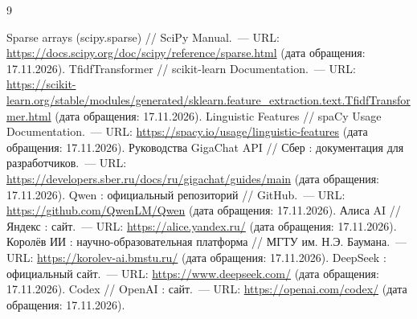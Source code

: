 \begin{thebibliography}{9}
 Sparse arrays (scipy.sparse) // SciPy Manual.~--- URL: \url{https://docs.scipy.org/doc/scipy/reference/sparse.html} (дата обращения: 17.11.2026).
 TfidfTransformer // scikit-learn Documentation.~--- URL: \url{https://scikit-learn.org/stable/modules/generated/sklearn.feature_extraction.text.TfidfTransformer.html} (дата обращения: 17.11.2026).
 Linguistic Features // spaCy Usage Documentation.~--- URL: \url{https://spacy.io/usage/linguistic-features} (дата обращения: 17.11.2026).
 Руководства GigaChat API // Сбер : документация для разработчиков.~--- URL: \url{https://developers.sber.ru/docs/ru/gigachat/guides/main} (дата обращения: 17.11.2026).
 Qwen : официальный репозиторий // GitHub.~--- URL: \url{https://github.com/QwenLM/Qwen} (дата обращения: 17.11.2026).
 Алиса AI // Яндекс : сайт.~--- URL: \url{https://alice.yandex.ru/} (дата обращения: 17.11.2026).
 Королёв ИИ : научно-образовательная платформа // МГТУ им. Н.Э. Баумана.~--- URL: \url{https://korolev-ai.bmstu.ru/} (дата обращения: 17.11.2026).
 DeepSeek : официальный сайт.~--- URL: \url{https://www.deepseek.com/} (дата обращения: 17.11.2026).
 Codex // OpenAI : сайт.~--- URL: \url{https://openai.com/codex/} (дата обращения: 17.11.2026).
\end{thebibliography}



